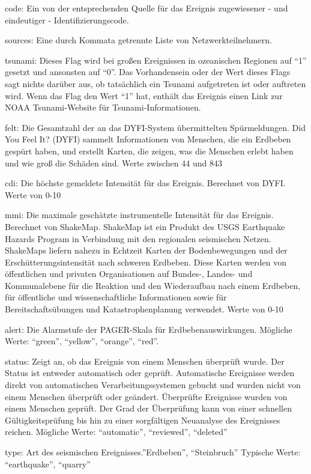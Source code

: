 \documentclass[
]{article}
\begin{document}
code: Ein von der entsprechenden Quelle für das Ereignis zugewiesener -
und eindeutiger - Identifizierungscode.

sources: Eine durch Kommata getrennte Liste von Netzwerkteilnehmern.

tsunami: Dieses Flag wird bei großen Ereignissen in ozeanischen Regionen
auf ``1'' gesetzt und ansonsten auf ``0''. Das Vorhandensein oder der
Wert dieses Flags sagt nichts darüber aus, ob tatsächlich ein Tsunami
aufgetreten ist oder auftreten wird. Wenn das Flag den Wert ``1'' hat,
enthält das Ereignis einen Link zur NOAA Tsunami-Website für
Tsunami-Informationen.

felt: Die Gesamtzahl der an das DYFI-System übermittelten Spürmeldungen.
Did You Feel It? (DYFI) sammelt Informationen von Menschen, die ein
Erdbeben gespürt haben, und erstellt Karten, die zeigen, was die
Menschen erlebt haben und wie groß die Schäden sind. Werte zwischen 44
und 843

cdi: Die höchste gemeldete Intensität für das Ereignis. Berechnet von
DYFI. Werte von 0-10

mmi: Die maximale geschätzte instrumentelle Intensität für das Ereignis.
Berechnet von ShakeMap. ShakeMap ist ein Produkt des USGS Earthquake
Hazards Program in Verbindung mit den regionalen seismischen Netzen.
ShakeMaps liefern nahezu in Echtzeit Karten der Bodenbewegungen und der
Erschütterungsintensität nach schweren Erdbeben. Diese Karten werden von
öffentlichen und privaten Organisationen auf Bundes-, Landes- und
Kommunalebene für die Reaktion und den Wiederaufbau nach einem Erdbeben,
für öffentliche und wissenschaftliche Informationen sowie für
Bereitschaftsübungen und Katastrophenplanung verwendet. Werte von 0-10

alert: Die Alarmstufe der PAGER-Skala für Erdbebenauswirkungen. Mögliche
Werte: ``green'', ``yellow'', ``orange'', ``red''.

status: Zeigt an, ob das Ereignis von einem Menschen überprüft wurde.
Der Status ist entweder automatisch oder geprüft. Automatische
Ereignisse werden direkt von automatischen Verarbeitungssystemen gebucht
und wurden nicht von einem Menschen überprüft oder geändert. Überprüfte
Ereignisse wurden von einem Menschen geprüft. Der Grad der Überprüfung
kann von einer schnellen Gültigkeitsprüfung bis hin zu einer
sorgfältigen Neuanalyse des Ereignisses reichen. Mögliche Werte:
``automatic'', ``reviewed'', ``deleted''

type: Art des seismischen Ereignisses.''Erdbeben'', ``Steinbruch''
Typische Werte: ``earthquake'', ``quarry''
\end{document}
